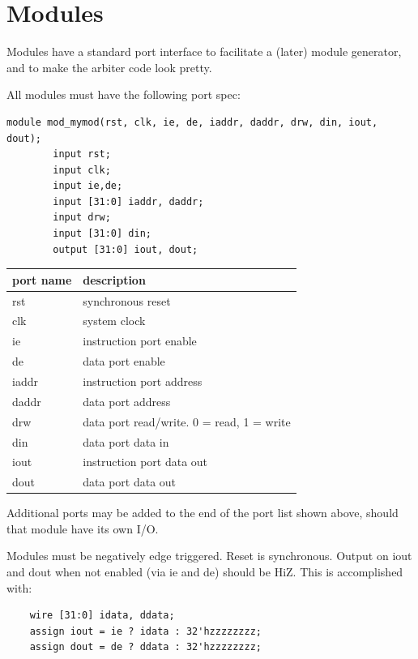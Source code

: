\documentclass{article}
\begin{document}
\section{Modules}

Modules have a standard port interface to facilitate a (later) module generator, and to make the arbiter code look pretty.

All modules must have the following port spec:

\begin{verbatim}
module mod_mymod(rst, clk, ie, de, iaddr, daddr, drw, din, iout, dout);
        input rst;
        input clk;
        input ie,de;
        input [31:0] iaddr, daddr;
        input drw;
        input [31:0] din;
        output [31:0] iout, dout;
\end{verbatim}

\begin{tabular}{|l|l|}
  \hline
  \textbf{port name} & \textbf{description}    \\ \hline
  rst	             & synchronous reset       \\ \hline
  clk                & system clock            \\ \hline
  ie	             & instruction port enable \\ \hline
  de                 & data port enable        \\ \hline
  iaddr              & instruction port address\\ \hline
  daddr	             & data port address       \\ \hline
  drw	             & data port read/write. 0 = read, 1 = write \\ \hline
  din                & data port data in       \\ \hline
  iout               & instruction port data out\\ \hline
  dout               & data port data out      \\ \hline
\end{tabular}

Additional ports may be added to the end of the port list shown above, should that module have its own I/O.

Modules must be negatively edge triggered. Reset is synchronous. Output on iout and dout when not enabled (via ie and de) should be HiZ. This is accomplished with:

\begin{verbatim}
	wire [31:0] idata, ddata;
	assign iout = ie ? idata : 32'hzzzzzzzz;
	assign dout = de ? ddata : 32'hzzzzzzzz;
\end{verbatim}
\end{document}
